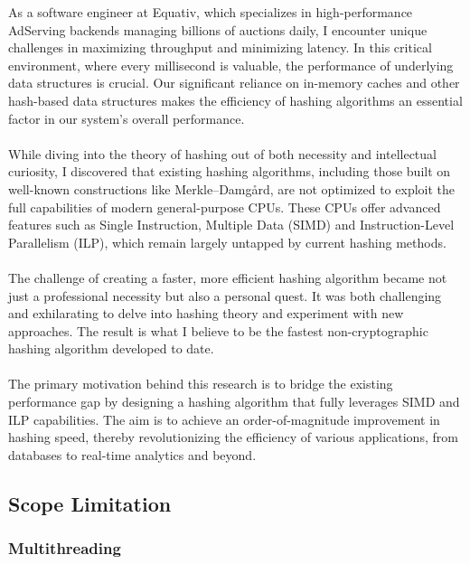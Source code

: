 \documentclass[10pt]{article}
\begin{document}
As a software engineer at Equativ, which specializes in high-performance AdServing backends managing billions of auctions daily, I encounter unique challenges in maximizing throughput and minimizing latency. In this critical environment, where every millisecond is valuable, the performance of underlying data structures is crucial. Our significant reliance on in-memory caches and other hash-based data structures makes the efficiency of hashing algorithms an essential factor in our system's overall performance.\\\\
While diving into the theory of hashing out of both necessity and intellectual curiosity, I discovered that existing hashing algorithms, including those built on well-known constructions like Merkle–Damgård, are not optimized to exploit the full capabilities of modern general-purpose CPUs.
These CPUs offer advanced features such as Single Instruction, Multiple Data (SIMD) and Instruction-Level Parallelism (ILP), which remain largely untapped by current hashing methods.\\\\
The challenge of creating a faster, more efficient hashing algorithm became not just a professional necessity but also a personal quest.
It was both challenging and exhilarating to delve into hashing theory and experiment with new approaches. The result is what I believe to be the fastest non-cryptographic hashing algorithm developed to date.\\\\
The primary motivation behind this research is to bridge the existing performance gap by designing a hashing algorithm that fully leverages SIMD and ILP capabilities. The aim is to achieve an order-of-magnitude improvement in hashing speed, thereby revolutionizing the efficiency of various applications, from databases to real-time analytics and beyond.

\subsection{Scope Limitation}

\subsubsection{Multithreading}
\end{document}
